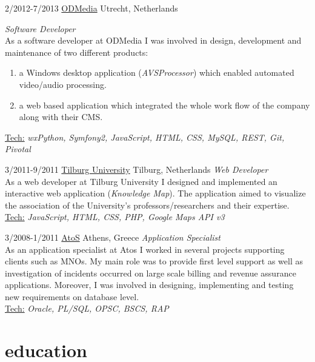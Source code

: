 \documentclass[]{friggeri-cv} %
\begin{document}
\begin{entrylist}
\entry
{2/2012-7/2013}
{\href{http://odmedia.nl}{ODMedia}}
{Utrecht, Netherlands}
{\emph {Software Developer} \\
As a software developer at ODMedia I was involved in design, development and maintenance of two different products:
\begin{enumerate}
\item a Windows desktop application (\emph{AVSProcessor}) which enabled automated video/audio processing.
\item a web based application which integrated the whole work flow of the company along with their CMS.
\end{enumerate}
\ul{Tech:} \emph{wxPython, Symfony2, JavaScript, HTML, CSS, MySQL, REST, Git, Pivotal}
}

\end{entrylist}
\begin{entrylist}
\entry
{3/2011-9/2011}
{\href{https://www.tilburguniversity.edu}{Tilburg University}}
{Tilburg, Netherlands}
{\emph {Web Developer} \\
As a web developer at Tilburg University I designed and implemented an interactive web application (\emph{Knowledge Map}). The application aimed to visualize the association of the University's professors/researchers and their expertise.\\
\ul{Tech:} \emph{JavaScript, HTML, CSS, PHP, Google Maps API v3}
}


\entry
{3/2008-1/2011}
{\href{http://atos.net/en-us/home.html}{AtoS}}
{Athens, Greece}
{\emph {Application Specialist}\\
As an application specialist at Atos I worked in several projects supporting clients such as MNOs. My main role was to provide first level support as well as investigation of incidents occurred on large scale billing and revenue assurance applications. Moreover, I was involved in designing, implementing and testing new requirements on database level.\\
\ul{Tech:} \emph{Oracle, PL/SQL, OPSC, BSCS, RAP} \\
}

\end{entrylist}



\section{education}
\end{document}
